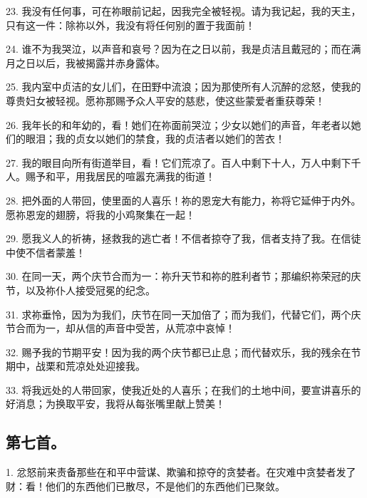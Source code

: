 23. 我没有任何事，可在祢眼前记起，因我完全被轻视。请为我记起，我的天主，只有这一件：除祢以外，我没有将任何别的置于我面前！\par

24. 谁不为我哭泣，以声音和哀号？因为在之日以前，我是贞洁且戴冠的；而在满月之日以后，我被揭露并赤身露体。\par

25. 我内室中贞洁的女儿们，在田野中流浪；因为那使所有人沉醉的忿怒，使我的尊贵妇女被轻视。愿祢那赐予众人平安的慈悲，使这些蒙爱者重获尊荣！\par

26. 我年长的和年幼的，看！她们在祢面前哭泣；少女以她们的声音，年老者以她们的眼泪；我的贞女以她们的禁食，我的贞洁者以她们的苦衣！\par

27. 我的眼目向所有街道举目，看！它们荒凉了。百人中剩下十人，万人中剩下千人。赐予和平，用我居民的喧嚣充满我的街道！\par

28. 把外面的人带回，使里面的人喜乐！祢的恩宠大有能力，祢将它延伸于内外。愿祢恩宠的翅膀，将我的小鸡聚集在一起！\par

29. 愿我义人的祈祷，拯救我的逃亡者！不信者掠夺了我，信者支持了我。在信徒中使不信者蒙羞！\par

30. 在同一天，两个庆节合而为一：祢升天节和祢的胜利者节；那编织祢荣冠的庆节，以及祢仆人接受冠冕的纪念。\par

31. 求祢垂怜，因为为我们，庆节在同一天加倍了；而为我们，代替它们，两个庆节合而为一，却从信的声音中受苦，从荒凉中哀悼！\par

32. 赐予我的节期平安！因为我的两个庆节都已止息；而代替欢乐，我的残余在节期中，战栗和荒凉处处迎接我。\par

33. 将我远处的人带回家，使我近处的人喜乐；在我们的土地中间，要宣讲喜乐的好消息；为换取平安，我将从每张嘴里献上赞美！\par


\subsection{第七首。}

1. 忿怒前来责备那些在和平中营谋、欺骗和掠夺的贪婪者。在灾难中贪婪者发了财：看！他们的东西他们已散尽，不是他们的东西他们已聚敛。\par

